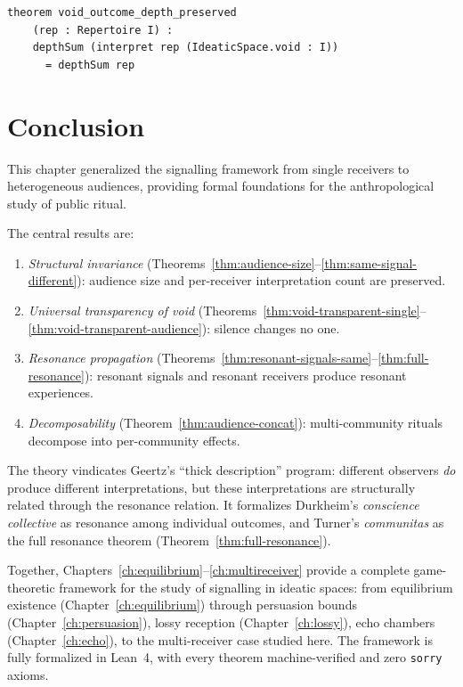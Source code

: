 \begin{lstlisting}[caption={Void outcome depth preservation in Lean~4.}]
theorem void_outcome_depth_preserved
    (rep : Repertoire I) :
    depthSum (interpret rep (IdeaticSpace.void : I))
      = depthSum rep
\end{lstlisting}


\section{Conclusion}
\label{sec:mr-conclusion}

This chapter generalized the signalling framework from single receivers to
heterogeneous audiences, providing formal foundations for the anthropological
study of public ritual.

The central results are:
\begin{enumerate}
  \item \emph{Structural invariance}
    (Theorems~\ref{thm:audience-size}--\ref{thm:same-signal-different}):
    audience size and per-receiver interpretation count are preserved.
  \item \emph{Universal transparency of void}
    (Theorems~\ref{thm:void-transparent-single}--\ref{thm:void-transparent-audience}):
    silence changes no one.
  \item \emph{Resonance propagation}
    (Theorems~\ref{thm:resonant-signals-same}--\ref{thm:full-resonance}):
    resonant signals and resonant receivers produce resonant experiences.
  \item \emph{Decomposability} (Theorem~\ref{thm:audience-concat}):
    multi-community rituals decompose into per-community effects.
\end{enumerate}

The theory vindicates Geertz's ``thick description'' program: different
observers \emph{do} produce different interpretations, but these
interpretations are structurally related through the resonance relation.
It formalizes Durkheim's \emph{conscience collective} as resonance among
individual outcomes, and Turner's \emph{communitas} as the full resonance
theorem (Theorem~\ref{thm:full-resonance}).

Together, Chapters~\ref{ch:equilibrium}--\ref{ch:multireceiver} provide a
complete game-theoretic framework for the study of signalling in ideatic
spaces: from equilibrium existence (Chapter~\ref{ch:equilibrium}) through
persuasion bounds (Chapter~\ref{ch:persuasion}), lossy reception
(Chapter~\ref{ch:lossy}), echo chambers (Chapter~\ref{ch:echo}), to the
multi-receiver case studied here.  The framework is fully formalized in
Lean~4, with every theorem machine-verified and zero \texttt{sorry} axioms.
